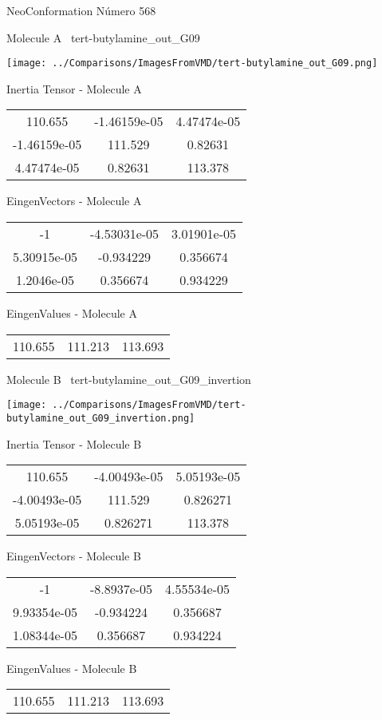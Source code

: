 \vtab[-3cm]
\begin{center}
{\large NeoConformation \tab Número 568}
\end{center}
\begin{multicols}{2}
\begin{center}

Molecule A \
tert-butylamine\_out\_G09

\texttt{[image: ../Comparisons/ImagesFromVMD/tert-butylamine\_out\_G09.png]}

Inertia Tensor - Molecule A \\
\begin{tabular}{|c c c|}
110.655	 & 	-1.46159e-05	 & 	4.47474e-05	 \\
-1.46159e-05	 & 	111.529	 & 	0.82631	 \\
4.47474e-05	 & 	0.82631	 & 	113.378
\end{tabular}

\vtab
 EingenVectors - Molecule A     \\
\begin{tabular}{|c c c|}
-1	 & 	-4.53031e-05	 & 	3.01901e-05	 \\
5.30915e-05	 & 	-0.934229	 & 	0.356674	 \\
1.2046e-05	 & 	0.356674	 & 	0.934229
\end{tabular}

\vtab
 EingenValues - Molecule A     \\
\begin{tabular}{|c c c|}
110.655	 & 	111.213	 & 	113.693	 \\
\end{tabular}
\columnbreak

Molecule B \
tert-butylamine\_out\_G09\_invertion

\texttt{[image: ../Comparisons/ImagesFromVMD/tert-butylamine\_out\_G09\_invertion.png]}

Inertia Tensor - Molecule B \\
\begin{tabular}{|c c c|}
110.655	 & 	-4.00493e-05	 & 	5.05193e-05	 \\
-4.00493e-05	 & 	111.529	 & 	0.826271	 \\
5.05193e-05	 & 	0.826271	 & 	113.378
\end{tabular}

\vtab
 EingenVectors - Molecule B     \\
\begin{tabular}{|c c c|}
-1	 & 	-8.8937e-05	 & 	4.55534e-05	 \\
9.93354e-05	 & 	-0.934224	 & 	0.356687	 \\
1.08344e-05	 & 	0.356687	 & 	0.934224
\end{tabular}

\vtab
 EingenValues - Molecule B     \\
\begin{tabular}{|c c c|}
110.655	 & 	111.213	 & 	113.693	 \\
\end{tabular}

\end{center}
\end{multicols}

